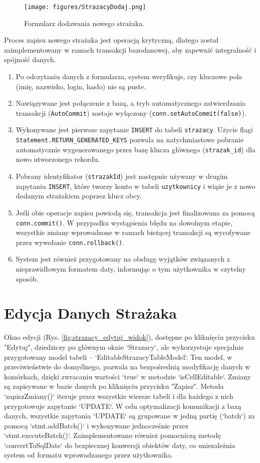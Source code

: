\begin{figure}[H]
	\centering
	\texttt{[image: figures/StrazacyDodaj.png]}
	\caption{Formularz dodawania nowego strażaka.}
	\label{fig:strazacy_dodaj_form}
\end{figure}

Proces zapisu nowego strażaka jest operacją krytyczną, dlatego został zaimplementowany w ramach transakcji bazodanowej, aby zapewnić integralność i spójność danych.
\begin{enumerate}
    \item Po odczytaniu danych z formularza, system weryfikuje, czy kluczowe pola (imię, nazwisko, login, hasło) nie są puste.
    \item Nawiązywane jest połączenie z bazą, a tryb automatycznego zatwierdzania transakcji (\texttt{AutoCommit}) zostaje wyłączony (\texttt{conn.setAutoCommit(false)}).
    \item Wykonywane jest pierwsze zapytanie \texttt{INSERT} do tabeli \texttt{strazacy}. Użycie flagi \texttt{Statement.RETURN\_GENERATED\_KEYS} pozwala na natychmiastowe pobranie automatycznie wygenerowanego przez bazę klucza głównego (\texttt{strazak\_id}) dla nowo utworzonego rekordu.
    \item Pobrany identyfikator (\texttt{strazakId}) jest następnie używany w drugim zapytaniu \texttt{INSERT}, które tworzy konto w tabeli \texttt{uzytkownicy} i wiąże je z nowo dodanym strażakiem poprzez klucz obcy.
    \item Jeśli obie operacje zapisu powiodą się, transakcja jest finalizowana za pomocą \texttt{conn.commit()}. W przypadku wystąpienia błędu na dowolnym etapie, wszystkie zmiany wprowadzone w ramach bieżącej transakcji są wycofywane przez wywołanie \texttt{conn.rollback()}.
    \item System jest również przygotowany na obsługę wyjątków związanych z nieprawidłowym formatem daty, informując o tym użytkownika w czytelny sposób.
\end{enumerate}

\section*{Edycja Danych Strażaka}
\label{sec:strazacy_edycja}

Okno edycji (Rys. \ref{fig:strazacy_edytuj_widok}), dostępne po kliknięciu przycisku "Edytuj", dziedziczy po głównym oknie `Strazacy`, ale wykorzystuje specjalnie przygotowany model tabeli – `EditableStrazacyTableModel`. Ten model, w przeciwieństwie do domyślnego, pozwala na bezpośrednią modyfikację danych w komórkach, dzięki zwracaniu wartości `true` w metodzie `isCellEditable`. Zmiany są zapisywane w bazie danych po kliknięciu przycisku "Zapisz". Metoda `zapiszZmiany()` iteruje przez wszystkie wiersze tabeli i dla każdego z nich przygotowuje zapytanie `UPDATE`. W celu optymalizacji komunikacji z bazą danych, wszystkie zapytania `UPDATE` są grupowane w jedną partię (`batch`) za pomocą `stmt.addBatch()` i wykonywane jednocześnie przez `stmt.executeBatch()`. Zaimplementowano również pomocniczą metodę `convertToSqlDate` do bezpiecznej konwersji obiektów daty, co uniezależnia system od formatu wprowadzanego przez użytkownika.

